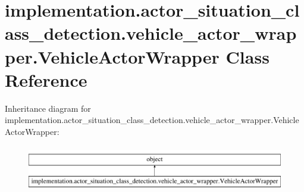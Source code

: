 \hypertarget{classimplementation_1_1actor__situation__class__detection_1_1vehicle__actor__wrapper_1_1_vehicle_actor_wrapper}{}\section{implementation.\+actor\+\_\+situation\+\_\+class\+\_\+detection.\+vehicle\+\_\+actor\+\_\+wrapper.\+Vehicle\+Actor\+Wrapper Class Reference}
\label{classimplementation_1_1actor__situation__class__detection_1_1vehicle__actor__wrapper_1_1_vehicle_actor_wrapper}
Inheritance diagram for implementation.\+actor\+\_\+situation\+\_\+class\+\_\+detection.\+vehicle\+\_\+actor\+\_\+wrapper.\+Vehicle\+Actor\+Wrapper\+:\begin{figure}[H]
\begin{center}
\leavevmode
\includegraphics[height=2.000000cm]{classimplementation_1_1actor__situation__class__detection_1_1vehicle__actor__wrapper_1_1_vehicle_actor_wrapper}
\end{center}
\end{figure}
